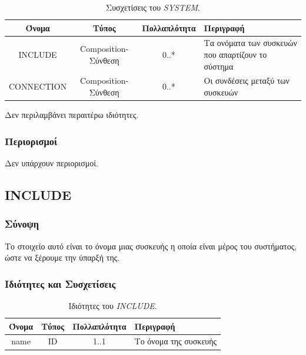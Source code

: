 \begin{table}[H]
	\begin{center}
		\caption{Συσχετίσεις του \textit{SYSTEM}.}
		\label{tab:system}
		\begin{tabular}{ | c | c | c| m{5.5cm} | }
			\hline
			\rowcolor{Gray}
			Όνομα & Τύπος & Πολλαπλότητα & Περιγραφή \\
			\hline
			INCLUDE & Composition-Σύνθεση & 0..* &  Τα ονόματα των συσκευών που απαρτίζουν το σύστημα \\
			\hline
			CONNECTION & Composition-Σύνθεση & 0..* &  Οι συνδέσεις μεταξύ των συσκευών \\
			\hline
		\end{tabular}
	\end{center}
\end{table}

\noindent Δεν περιλαμβάνει περαιτέρω ιδιότητες.

\subsubsection*{Περιορισμοί}

\noindent Δεν υπάρχουν περιορισμοί.

\subsection{INCLUDE}
\label{subsec:include}

\subsubsection*{Σύνοψη}

\noindent Το στοιχείο αυτό είναι το όνομα μιας συσκευής η οποία είναι μέρος του συστήματος, ώστε να ξέρουμε την ύπαρξή της.

\subsubsection*{Ιδιότητες και Συσχετίσεις}

\begin{table}[H]
	\begin{center}
		\caption{Ιδιότητες του \textit{INCLUDE}.}
		\label{tab:include}
		\begin{tabular}{ | c | c | c| m{5.5cm} | }
			\hline
			\rowcolor{Gray}
			Όνομα & Τύπος & Πολλαπλότητα & Περιγραφή \\
			\hline
			name & ID & 1..1 &  Το όνομα της συσκευής \\
			\hline
		\end{tabular}
	\end{center}
\end{table}

